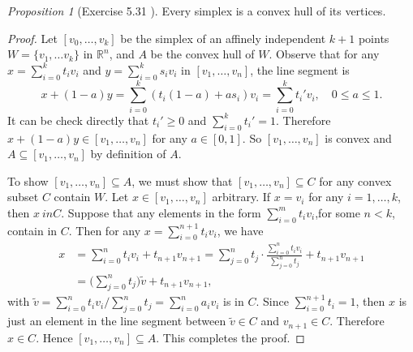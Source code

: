 \documentclass[a4paper]{article}
\theoremstyle{remark}
\newtheorem{prop}{Proposition}
\newcommand{\rn}{\mathbb{R}^n} %
\newcommand{\subhim}{\subseteq} %
\begin{document}
\begin{prop}[Exercise 5.31 \cite{LeeTM} ]
	Every simplex is a convex hull of its vertices.
\end{prop}
\begin{proof}
	Let $[v_0,\dots,v_k]$ be the simplex of an affinely independent $k+1$ points $W = \{v_1,\dots v_k\}$ in $\rn$, and $A$ be the convex hull of $W$. Observe that for any $x = \sum_{i=0}^k t_i v_i$ and $y = \sum_{i=0}^k s_i v_i$ in $[v_1,\dots,v_n]$, the line segment is
	$$
    x+(1-a)y = \sum_{i=0}^k (t_i(1-a) + as_i) v_i = \sum_{i=0}^k t_i' v_i, \quad 0\leq a \leq 1.
	$$ 
	It can be check directly that $t_i' \geq 0$ and $\sum_{i=0}^k t_i' = 1$. Therefore $x+(1-a)y \in [v_1,\dots,v_n]$ for any $a\in [0,1]$. So $[v_1,\dots,v_n]$ is convex and $A \subhim [v_1,\dots,v_n]$ by definition of $A$.
	
	To show $[v_1,\dots,v_n] \subhim A$, we must show that $[v_1,\dots,v_n] \subhim C$ for any convex subset $C$ contain $W$. Let $x \in [v_1,\dots,v_n]$ arbitrary. If $x = v_i$ for any $i=1,\dots,k$, then $x\ in C$. Suppose that any elements in the form $ \sum_{i=0}^m t_i v_i$,for some $n < k$, contain in $C$. Then for any $x = \sum_{i=0}^{n+1} t_i v_i$, we have
	\begin{align*}
	x &=  \sum_{i=0}^{n} t_i v_i + t_{n+1} v_{n+1} = \sum_{j=0}^n t_j \cdot \frac{\sum_{i=0}^{n} t_i v_i}{\sum_{j=0}^n t_j} + t_{n+1} v_{n+1}\\ &= \big(\sum_{j=0}^n t_j \big) \tilde{v} + t_{n+1} v_{n+1},
	\end{align*}
	with $\tilde{v} = \sum_{i=0}^{n} t_i v_i / \sum_{j=0}^n t_j = \sum_{i=0}^n a_i v_i$ is in $C$. Since $\sum_{i=0}^{n+1}t_i = 1$, then $x$ is just an element in the line segment between $\tilde{v} \in C$ and $v_{n+1} \in C$. Therefore $x \in C$. Hence $[v_1,\dots,v_n] \subhim A$. This completes the proof.  
\end{proof}
\end{document}
